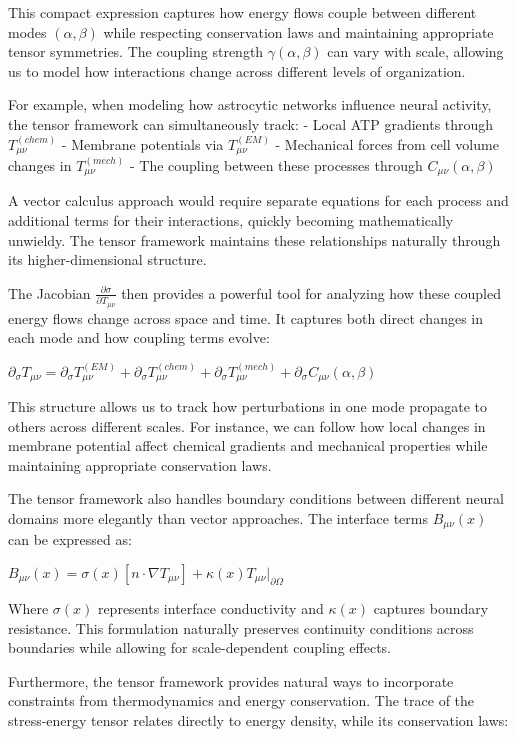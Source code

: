 This compact expression captures how energy flows couple between different modes $(\alpha,\beta)$ while respecting conservation laws and maintaining appropriate tensor symmetries. The coupling strength $\gamma(\alpha,\beta)$ can vary with scale, allowing us to model how interactions change across different levels of organization.

For example, when modeling how astrocytic networks influence neural activity, the tensor framework can simultaneously track:
- Local ATP gradients through $T^{(chem)}_{\mu\nu}$
- Membrane potentials via $T^{(EM)}_{\mu\nu}$
- Mechanical forces from cell volume changes in $T^{(mech)}_{\mu\nu}$
- The coupling between these processes through $C_{\mu\nu}(\alpha,\beta)$

A vector calculus approach would require separate equations for each process and additional terms for their interactions, quickly becoming mathematically unwieldy. The tensor framework maintains these relationships naturally through its higher-dimensional structure.

The Jacobian $\frac{\partial \sigma}{\partial T_{\mu\nu}}$ then provides a powerful tool for analyzing how these coupled energy flows change across space and time. It captures both direct changes in each mode and how coupling terms evolve:

$\partial_\sigma T_{\mu\nu} = \partial_\sigma T^{(EM)}_{\mu\nu} + \partial_\sigma T^{(chem)}_{\mu\nu} + \partial_\sigma T^{(mech)}_{\mu\nu} + \partial_\sigma C_{\mu\nu}(\alpha,\beta)$

This structure allows us to track how perturbations in one mode propagate to others across different scales. For instance, we can follow how local changes in membrane potential affect chemical gradients and mechanical properties while maintaining appropriate conservation laws.

The tensor framework also handles boundary conditions between different neural domains more elegantly than vector approaches. The interface terms $B_{\mu\nu}(x)$ can be expressed as:

$B_{\mu\nu}(x) = \sigma(x)[n \cdot \nabla T_{\mu\nu}] + \kappa(x)T_{\mu\nu}|_{\partial\Omega}$

Where $\sigma(x)$ represents interface conductivity and $\kappa(x)$ captures boundary resistance. This formulation naturally preserves continuity conditions across boundaries while allowing for scale-dependent coupling effects.

Furthermore, the tensor framework provides natural ways to incorporate constraints from thermodynamics and energy conservation. The trace of the stress-energy tensor relates directly to energy density, while its conservation laws:


